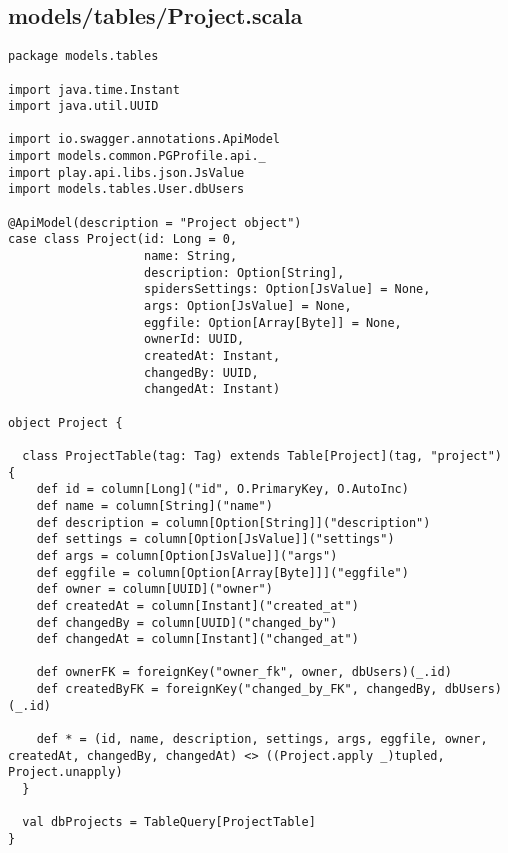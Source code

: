 \subsection{models/tables/Project.scala}
\begin{lstlisting}
package models.tables

import java.time.Instant
import java.util.UUID

import io.swagger.annotations.ApiModel
import models.common.PGProfile.api._
import play.api.libs.json.JsValue
import models.tables.User.dbUsers

@ApiModel(description = "Project object")
case class Project(id: Long = 0,
                   name: String,
                   description: Option[String],
                   spidersSettings: Option[JsValue] = None,
                   args: Option[JsValue] = None,
                   eggfile: Option[Array[Byte]] = None,
                   ownerId: UUID,
                   createdAt: Instant,
                   changedBy: UUID,
                   changedAt: Instant)

object Project {

  class ProjectTable(tag: Tag) extends Table[Project](tag, "project") {
    def id = column[Long]("id", O.PrimaryKey, O.AutoInc)
    def name = column[String]("name")
    def description = column[Option[String]]("description")
    def settings = column[Option[JsValue]]("settings")
    def args = column[Option[JsValue]]("args")
    def eggfile = column[Option[Array[Byte]]]("eggfile")
    def owner = column[UUID]("owner")
    def createdAt = column[Instant]("created_at")
    def changedBy = column[UUID]("changed_by")
    def changedAt = column[Instant]("changed_at")

    def ownerFK = foreignKey("owner_fk", owner, dbUsers)(_.id)
    def createdByFK = foreignKey("changed_by_FK", changedBy, dbUsers)(_.id)

    def * = (id, name, description, settings, args, eggfile, owner, createdAt, changedBy, changedAt) <> ((Project.apply _)tupled, Project.unapply)
  }

  val dbProjects = TableQuery[ProjectTable]
}\end{lstlisting}
